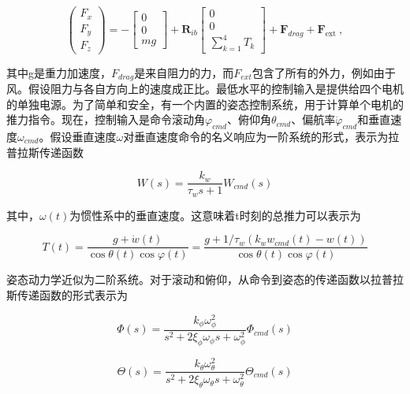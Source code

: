 \begin{equation}
\left(\begin{array}{l}
F_{x} \\
F_{y} \\
F_{z}
\end{array}\right)=-\left[\begin{array}{c}
0 \\
0 \\
m g
\end{array}\right]+\boldsymbol{R}_{i b}\left[\begin{array}{c}
0 \\
0 \\
\sum_{k=1}^{4} T_{k}
\end{array}\right]+\boldsymbol{F}_{d r a g}+\boldsymbol{F}_{\text {ext }},
\end{equation}

其中g是重力加速度，$F_{drag}$是来自阻力的力，而$F_{ext}$包含了所有的外力，例如由于风。假设阻力与各自方向上的速度成正比。最低水平的控制输入是提供给四个电机的单独电源。为了简单和安全，有一个内置的姿态控制系统，用于计算单个电机的推力指令\cite{ArtE14}。现在，控制输入是命令滚动角$\varphi_{cmd}$、俯仰角$\theta_{cmd}$、偏航率$\dot{\varphi}_{cmd}$和垂直速度$\omega_{cmd}$。假设垂直速度$\omega$对垂直速度命令的名义响应为一阶系统的形式，表示为拉普拉斯传递函数

\begin{equation}
W(s)=\frac{k_{w}}{\tau_{w} s+1} W_{c m d}(s)
\end{equation}

其中，$\omega(t)$为惯性系中的垂直速度。这意味着t时刻的总推力可以表示为

\begin{equation}
T(t)=\frac{g+\dot{w}(t)}{\cos \theta(t) \cos \varphi(t)}=\frac{g+1 / \tau_{w}\left(k_{w} w_{c m d}(t)-w(t)\right)}{\cos \theta(t) \cos \varphi(t)}
\end{equation}

姿态动力学近似为二阶系统。对于滚动和俯仰，从命令到姿态的传递函数以拉普拉斯传递函数的形式表示为

\begin{equation}
\Phi(s)=\frac{k_{\phi} \omega_{\phi}^{2}}{s^{2}+2 \xi_{\phi} \omega_{\phi} s+\omega_{\phi}^{2}} \Phi_{c m d}(s)
\end{equation}

\begin{equation}
\Theta(s)=\frac{k_{\theta} \omega_{\theta}^{2}}{s^{2}+2 \xi_{\theta} \omega_{\theta} s+\omega_{\theta}^{2}} \Theta_{c m d}(s)
\end{equation}

